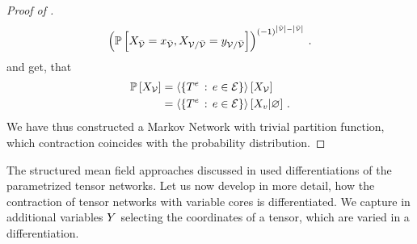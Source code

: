 \begin{proof}[Proof of ]
\begin{align*}
		\left(
			\mathbb{P}\left[X_{\bar{\mathcal{V}}}=x_{\bar{\mathcal{V}}},X_{\mathcal{V}/\bar{\mathcal{V}}}=y_{\mathcal{V}/\bar{\mathcal{V}}}\right]
		\right)^{(-1)^{\left|\tilde{\mathcal{V}}\right|-\left|\bar{\mathcal{V}}\right|}} \, .
	\end{align*}
	and get, that
	\begin{align*}
		\mathbb{P}\left[X_{\mathcal{V}}\right] & = \left\langle \{T^{e}\, : \, e\in\mathcal{E}\}\right\rangle \left[ X_{\mathcal{V}} \right] \\
		& = \left\langle \{T^{e}\, : \, e\in\mathcal{E}\}\right\rangle \left[ X_{v} | \varnothing \right] \, .
	\end{align*}
	We have thus constructed a Markov Network with trivial partition function, which contraction coincides with the probability distribution.
\end{proof}


The structured mean field approaches discussed in  used differentiations of the parametrized tensor networks.
Let us now develop in more detail, how the contraction of tensor networks with variable cores is differentiated.
We capture in additional variables $Y$ selecting the coordinates of a tensor, which are varied in a differentiation.

